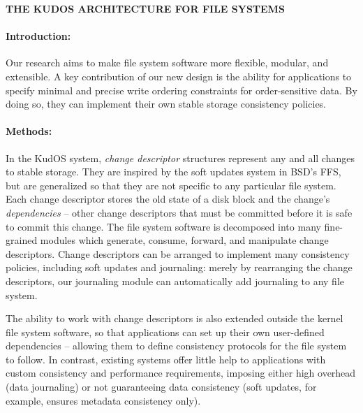\documentclass[12pt]{article}
\newcommand{\preparagraphspacing}{}%
\begin{document}
\noindent\textbf{THE KUDOS ARCHITECTURE FOR FILE SYSTEMS}




\preparagraphspacing
\paragraph{Introduction:}

Our research aims to make file system software more flexible, modular,
and \mbox{extensible}. A key contribution of our new design is the ability
for applications to specify minimal and precise write ordering
constraints for order-sensitive data. By doing so, they can implement
their own stable storage consistency policies.

\preparagraphspacing
\paragraph{Methods:}

In the KudOS system, \emph{change descriptor} structures represent any and all
changes to stable storage. They are inspired by the soft updates system in BSD's
FFS, but are generalized so that they are not specific to any particular file
system. Each change descriptor stores the old state of a disk block and the
change's \emph{dependencies} -- other change descriptors that must be committed
before it is safe to commit this change. The file system software is decomposed
into many fine-grained modules which generate, consume, forward, and manipulate
change descriptors. Change descriptors can be arranged to implement many
consistency policies, including soft updates and journaling: merely by
rearranging the change descriptors, our journaling module can automatically add
journaling to any file system.

The ability to work with change descriptors is also extended outside the
kernel file system software, so that applications can set up their own
user-defined dependencies -- allowing them to define consistency protocols for
the file system to follow. In contrast, existing systems offer little help to
applications with custom consistency and performance requirements, imposing
either high overhead (data journaling) or not guaranteeing data consistency
(soft updates, for example, ensures metadata consistency only).
\end{document}

